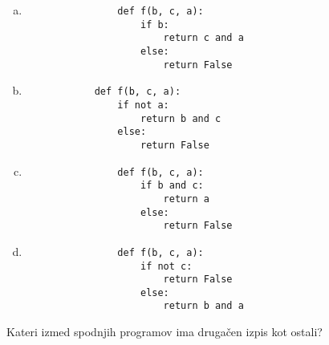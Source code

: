 \documentclass[arhiv, 10pt]{../izpit}
\begin{document}
        \begin{multicols}{2}
        \begin{enumerate}[(a)]
\item 
                \begin{verbatim}
                def f(b, c, a):
                    if b:
                        return c and a
                    else:
                        return False
                \end{verbatim}
            
\item 
            \begin{verbatim}
            def f(b, c, a):
                if not a:
                    return b and c
                else:
                    return False
            \end{verbatim}
        
\item 
                \begin{verbatim}
                def f(b, c, a):
                    if b and c:
                        return a
                    else:
                        return False
                \end{verbatim}
            
\item 
                \begin{verbatim}
                def f(b, c, a):
                    if not c:
                        return False
                    else:
                        return b and a
                \end{verbatim}
            
\end{enumerate}

        \end{multicols}
    
        \naloga*
        
        Kateri izmed spodnjih programov ima drugačen izpis kot ostali?
    
\end{document}

